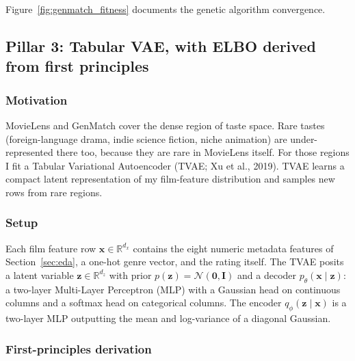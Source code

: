 \documentclass{article}
\begin{document}
Figure~\ref{fig:genmatch_fitness} documents the genetic algorithm convergence.

\subsection{Pillar 3: Tabular VAE, with ELBO derived from first principles}

\subsubsection*{Motivation}

MovieLens and GenMatch cover the dense region of taste space. Rare tastes (foreign-language drama, indie science fiction, niche animation) are under-represented there too, because they are rare in MovieLens itself. For those regions I fit a Tabular Variational Autoencoder (TVAE; Xu et al., 2019). TVAE learns a compact latent representation of my film-feature distribution and samples new rows from rare regions.

\subsubsection*{Setup}

Each film feature row $\mathbf{x} \in \mathbb{R}^{d_x}$ contains the eight numeric metadata features of Section~\ref{sec:eda}, a one-hot genre vector, and the rating itself. The TVAE posits a latent variable $\mathbf{z} \in \mathbb{R}^{d_z}$ with prior $p(\mathbf{z}) = \mathcal{N}(\mathbf{0}, \mathbf{I})$ and a decoder $p_\theta(\mathbf{x} \mid \mathbf{z})$: a two-layer Multi-Layer Perceptron (MLP) with a Gaussian head on continuous columns and a softmax head on categorical columns. The encoder $q_\phi(\mathbf{z} \mid \mathbf{x})$ is a two-layer MLP outputting the mean and log-variance of a diagonal Gaussian.

\subsubsection*{First-principles derivation}
\end{document}
